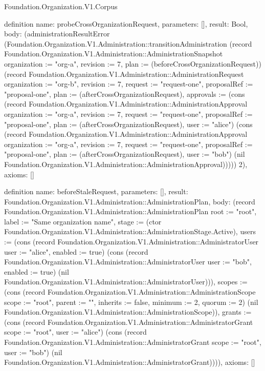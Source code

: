 \begin{lexlean}{Foundation.Organization.V1.Corpus}
\begin{semanticmodule}
definition{
  name: probeCrossOrganizationRequest,
  parameters: [],
  result: Bool,
  body: (administrationResultError (Foundation.Organization.V1.Administration::transitionAdministration (record Foundation.Organization.V1.Administration::AdministrationSnapshot {organization := "org-a", revision := 7, plan := (beforeCrossOrganizationRequest)}) (record Foundation.Organization.V1.Administration::AdministrationRequest {organization := "org-b", revision := 7, request := "request-one", proposalRef := "proposal-one", plan := (afterCrossOrganizationRequest), approvals := (cons (record Foundation.Organization.V1.Administration::AdministrationApproval {organization := "org-a", revision := 7, request := "request-one", proposalRef := "proposal-one", plan := (afterCrossOrganizationRequest), user := "alice"}) (cons (record Foundation.Organization.V1.Administration::AdministrationApproval {organization := "org-a", revision := 7, request := "request-one", proposalRef := "proposal-one", plan := (afterCrossOrganizationRequest), user := "bob"}) (nil Foundation.Organization.V1.Administration::AdministrationApproval)))})) 2),
  axioms: []
}

definition{
  name: beforeStaleRequest,
  parameters: [],
  result: Foundation.Organization.V1.Administration::AdministrationPlan,
  body: (record Foundation.Organization.V1.Administration::AdministrationPlan {root := "root", label := "Same organization name", stage := (ctor Foundation.Organization.V1.Administration::AdministrationStage.Active), users := (cons (record Foundation.Organization.V1.Administration::AdministratorUser {user := "alice", enabled := true}) (cons (record Foundation.Organization.V1.Administration::AdministratorUser {user := "bob", enabled := true}) (nil Foundation.Organization.V1.Administration::AdministratorUser))), scopes := (cons (record Foundation.Organization.V1.Administration::AdministrationScope {scope := "root", parent := "", inherits := false, minimum := 2, quorum := 2}) (nil Foundation.Organization.V1.Administration::AdministrationScope)), grants := (cons (record Foundation.Organization.V1.Administration::AdministratorGrant {scope := "root", user := "alice"}) (cons (record Foundation.Organization.V1.Administration::AdministratorGrant {scope := "root", user := "bob"}) (nil Foundation.Organization.V1.Administration::AdministratorGrant)))}),
  axioms: []
}


\end{semanticmodule}
\end{lexlean}
